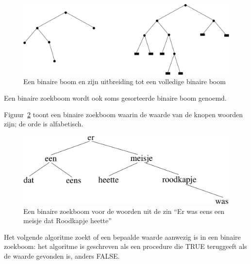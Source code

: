 \begin{figure}[ht]
\begin{center}
\includegraphics[width=0.6\linewidth,keepaspectratio]{uitbreiding1}
\end{center}
\caption{Een binaire boom en zijn uitbreiding tot een volledige binaire boom\label{uitbreiding1}}
\end{figure}



Een binaire zoekboom wordt ook soms gesorteerde binaire boom genoemd.

Figuur~\ref{binboom1} toont een binaire zoekboom waarin de waarde van
de knopen woorden zijn; de orde is alfabetisch.

\begin{figure}[ht]
\begin{center}
\includegraphics[width=0.6\linewidth,keepaspectratio]{binboom1}
\end{center}
\caption{Een binaire zoekboom voor de woorden uit de zin
``Er was eens een meisje dat Roodkapje heette'' \label{binboom1}}
\end{figure}

Het volgende algoritme zoekt of een bepaalde waarde aanwezig is in een
binaire zoekboom: het algoritme is geschreven als een procedure die
TRUE teruggeeft als de waarde gevonden is, anders FALSE.


